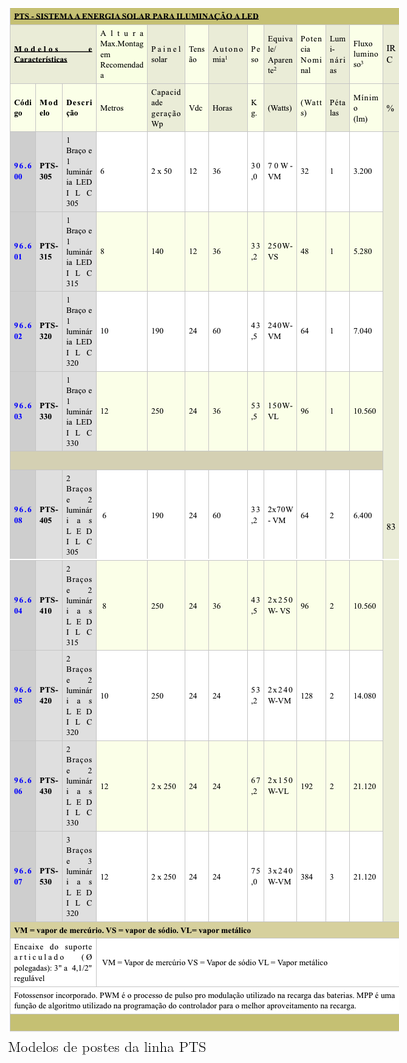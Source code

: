\begin{figure}[H]
	 \centering
	\label{TabelaModelosPoste}
	 \includegraphics[keepaspectratio=true,scale=0.4]{figuras/TabelaModelosPoste.png}
	 \caption{Modelos de postes da linha PTS}
\end{figure}

